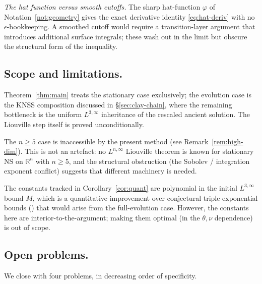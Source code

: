 \documentclass[11pt]{amsart}
\theoremstyle{definition}
\newcommand{\RR}{\mathbb{R}}
\begin{document}
\emph{The hat function versus smooth cutoffs.} The sharp
hat-function $\varphi$ of Notation~\ref{not:geometry} gives the
exact derivative identity \eqref{eq:hat-deriv} with no
$\epsilon$-bookkeeping. A smoothed cutoff would require a
transition-layer argument that introduces additional surface
integrals; these wash out in the limit but obscure the structural
form of the inequality.

\subsection{Scope and limitations.}

Theorem~\ref{thm:main} treats the stationary case exclusively;
the evolution case is the KNSS composition discussed in
\S\ref{sec:clay-chain}, where the remaining bottleneck is the
uniform $L^{3,\infty}$ inheritance of the rescaled ancient
solution. The Liouville step itself is proved unconditionally.

The $n \geq 5$ case is inaccessible by the present method (see
Remark~\ref{rem:high-dim}). This is not an artefact: no
$L^{n,\infty}$ Liouville theorem is known for stationary NS on
$\RR^n$ with $n \geq 5$, and the structural obstruction (the
Sobolev / integration exponent conflict) suggests that different
machinery is needed.

The constants tracked in Corollary~\ref{cor:quant} are polynomial
in the initial $L^{3,\infty}$ bound $M$, which is a quantitative
improvement over conjectural triple-exponential bounds
(\cite{Tao2019}) that would arise from the full-evolution case.
However, the constants here are interior-to-the-argument; making
them optimal (in the $\theta, \nu$ dependence) is out of scope.

\subsection{Open problems.}

We close with four problems, in decreasing order of specificity.
\end{document}
